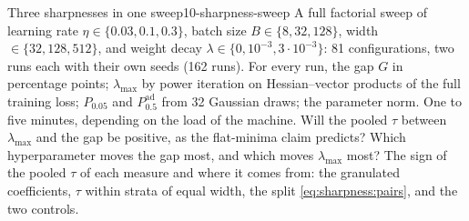 \begin{refsection}
\begin{lab}{Three sharpnesses in one sweep}{10-sharpness-sweep}\label{lab:sharpness:sweep}
 A full factorial sweep of learning rate $\eta\in\{0.03,0.1,0.3\}$, batch size $B\in\{8,32,128\}$, width $\in\{32,128,512\}$, and weight decay $\lambda\in\{0,10^{-3},3\cdot10^{-3}\}$: 81 configurations, two runs each with their own seeds (162 runs). For every run, the gap $G$ in percentage points; $\lambda_{\max}$ by power iteration on Hessian--vector products of the full training loss; $P_{0.05}$ and $P^{\mathrm{ad}}_{0.5}$ from 32 Gaussian draws; the parameter norm. One to five minutes, depending on the load of the machine.
 Will the pooled $\tau$ between $\lambda_{\max}$ and the gap be positive, as the flat-minima claim predicts? Which hyperparameter moves the gap most, and which moves $\lambda_{\max}$ most?
 The sign of the pooled $\tau$ of each measure and where it comes from: the granulated coefficients, $\tau$ within strata of equal width, the split \eqref{eq:sharpness:pairs}, and the two controls.
\end{lab}


\end{refsection}
